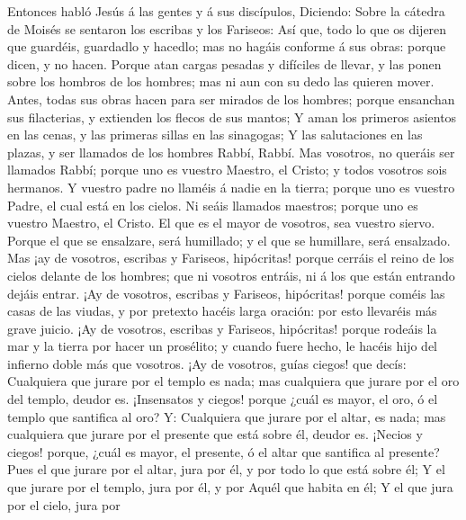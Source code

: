  Entonces habló Jesús á las gentes y á sus discípulos,
 Diciendo: Sobre la cátedra de Moisés se sentaron los
escribas y los Fariseos:  Así que, todo lo que os dijeren
que guardéis, guardadlo y hacedlo; mas no hagáis conforme á sus obras:
porque dicen, y no hacen.  Porque atan cargas pesadas y
difíciles de llevar, y las ponen sobre los hombros de los hombres; mas
ni aun con su dedo las quieren mover.  Antes, todas sus
obras hacen para ser mirados de los hombres; porque ensanchan sus
filacterias, y extienden los flecos de sus mantos;  Y aman
los primeros asientos en las cenas, y las primeras sillas en las
sinagogas;  Y las salutaciones en las plazas, y ser
llamados de los hombres Rabbí, Rabbí.  Mas vosotros, no
queráis ser llamados Rabbí; porque uno es vuestro Maestro, el Cristo; y
todos vosotros sois hermanos.  Y vuestro padre no llaméis
á nadie en la tierra; porque uno es vuestro Padre, el cual está en los
cielos.  Ni seáis llamados maestros; porque uno es
vuestro Maestro, el Cristo.  El que es el mayor de
vosotros, sea vuestro siervo.  Porque el que se
ensalzare, será humillado; y el que se humillare, será ensalzado.
 Mas ¡ay de vosotros, escribas y Fariseos, hipócritas!
porque cerráis el reino de los cielos delante de los hombres; que ni
vosotros entráis, ni á los que están entrando dejáis entrar.
 ¡Ay de vosotros, escribas y Fariseos, hipócritas! porque
coméis las casas de las viudas, y por pretexto hacéis larga oración: por
esto llevaréis más grave juicio.  ¡Ay de vosotros,
escribas y Fariseos, hipócritas! porque rodeáis la mar y la tierra por
hacer un prosélito; y cuando fuere hecho, le hacéis hijo del infierno
doble más que vosotros.  ¡Ay de vosotros, guías ciegos!
que decís: Cualquiera que jurare por el templo es nada; mas cualquiera
que jurare por el oro del templo, deudor es.  ¡Insensatos
y ciegos! porque ¿cuál es mayor, el oro, ó el templo que santifica al
oro?  Y: Cualquiera que jurare por el altar, es nada; mas
cualquiera que jurare por el presente que está sobre él, deudor es.
 ¡Necios y ciegos! porque, ¿cuál es mayor, el presente, ó
el altar que santifica al presente?  Pues el que jurare
por el altar, jura por él, y por todo lo que está sobre él;
 Y el que jurare por el templo, jura por él, y por Aquél
que habita en él;  Y el que jura por el cielo, jura por
